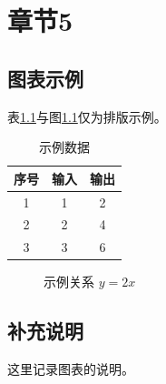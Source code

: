 \chapter{章节5}
\label{chap:chapter5}

\section{图表示例}
表\ref{tab:example}与图\ref{fig:example}仅为排版示例。
\begin{table}[htbp]
  \centering
  \caption{示例数据}\label{tab:example}
  \begin{tabular}{ccc}
    \toprule
    序号 & 输入 & 输出 \\
    \midrule
    1 & 1 & 2 \\
    2 & 2 & 4 \\
    3 & 3 & 6 \\
    \bottomrule
  \end{tabular}
\end{table}

\begin{figure}[htbp]
  \centering
  \caption{示例关系 \(y=2x\)}\label{fig:example}
\end{figure}

\section{补充说明}
这里记录图表的说明。
